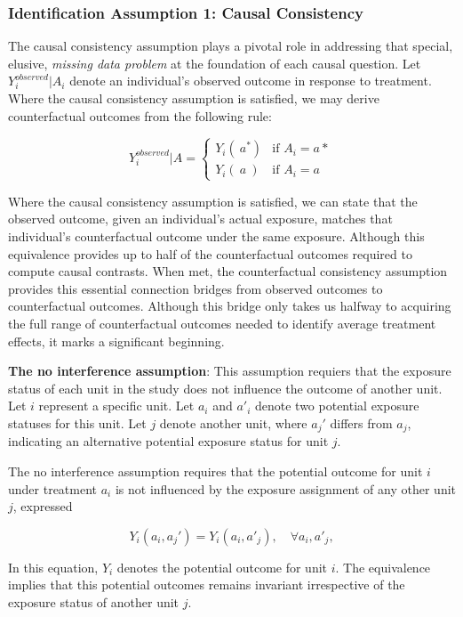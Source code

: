 \documentclass[
  singlecolumn]{article}
\begin{document}
\hypertarget{identification-assumption-1-causal-consistency}{%
\subsubsection{Identification Assumption 1: Causal
Consistency}\label{identification-assumption-1-causal-consistency}}

The causal consistency assumption plays a pivotal role in addressing
that special, elusive, \emph{missing data problem} at the foundation of
each causal question. Let \(Y_i^{observed}|A_i\) denote an individual's
observed outcome in response to treatment. Where the causal consistency
assumption is satisfied, we may derive counterfactual outcomes from the
following rule:

\[
Y_i^{observed}|A = 
\begin{cases} 
Y_i(~a^*) & \text{if } A_i = a* \\
Y_i(~a~) & \text{if } A_i = a
\end{cases}
\]

Where the causal consistency assumption is satisfied, we can state that
the observed outcome, given an individual's actual exposure, matches
that individual's counterfactual outcome under the same exposure.
Although this equivalence provides up to half of the counterfactual
outcomes required to compute causal contrasts. When met, the
counterfactual consistency assumption provides this essential connection
bridges from observed outcomes to counterfactual outcomes. Although this
bridge only takes us halfway to acquiring the full range of
counterfactual outcomes needed to identify average treatment effects, it
marks a significant beginning.

\textbf{The no interference assumption}: This assumption requiers that
the exposure status of each unit in the study does not influence the
outcome of another unit. Let \(i\) represent a specific unit. Let
\(a_i\) and \(a'_i\) denote two potential exposure statuses for this
unit. Let \(j\) denote another unit, where \(a_j'\) differs from
\(a_j\), indicating an alternative potential exposure status for unit
\(j\).

The no interference assumption requires that the potential outcome for
unit \(i\) under treatment \(a_i\) is not influenced by the exposure
assignment of any other unit \(j\), expressed

\[
Y_i(a_i, a_j') = Y_i(a_i, a'_j), \quad \forall a_i, a'_j,
\]

In this equation, \(Y_i\) denotes the potential outcome for unit \(i\).
The equivalence implies that this potential outcomes remains invariant
irrespective of the exposure status of another unit \(j\).
\end{document}
